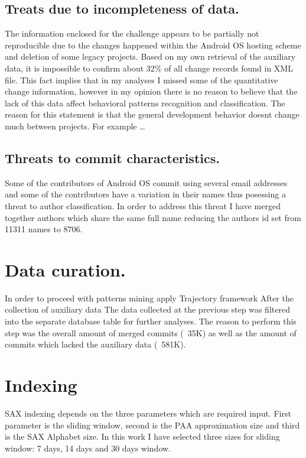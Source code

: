 \documentclass[a4paper,10pt]{article}
\numberwithin{equation}{subsection}
\begin{document}
\subsection{Treats due to incompleteness of data.}
The information enclosed for the challenge appears to be partially not reproducible due to the 
changes happened within the Android OS hosting scheme and deletion of some legacy projects.
Based on my own retrieval of the auxiliary data, it is impossible to confirm about 32\% of all
change records found in XML file. This fact implies that in my analyses I missed some of the 
quantitative change information, however in my opinion there is no reason to believe that 
the lack of this data affect behavioral patterns recognition and classification. The reason
for this statement is that the general development behavior doesnt change much between projects.
For example \ldots

\subsection{Threats to commit characteristics.}
Some of the contributors of Android OS commit using several email addresses and some of the 
contributors have a variation in their names thus posessing a threat to author classification.
In order to address this threat I have merged together authors which share the same full name
reducing the authors id set from 11311 names to 8706.

\section{Data curation.}
In order to proceed with patterns mining apply Trajectory framework After the collection of auxiliary data 
The data collected at the previous step was filtered into the separate database table for further analyses.
The reason to perform this step was the overall amount of merged commits (~35K) as well as the amount of 
commits which lacked the auxiliary data (~581K).

\section{Indexing}
SAX indexing depends on the three parameters which are required input. First parameter is
the sliding window, second is the PAA approximation size and third is the SAX Alphabet size.
In this work I have selected three sizes for sliding window: 7 days, 14 days and 30 days window.
\end{document}
